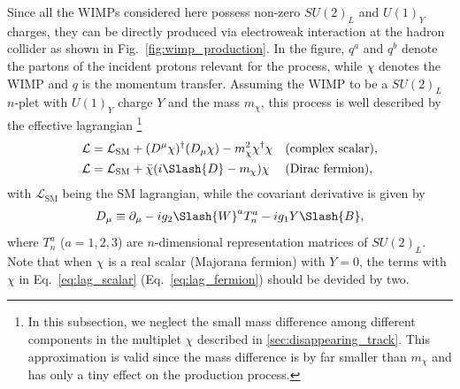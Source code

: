 \documentclass[12pt,twoside,book]{article}
\begin{document}
Since all the WIMPs considered here possess non-zero $SU(2)_L$ and $U(1)_Y$ charges, they can be directly produced via electroweak interaction at the hadron collider as shown in Fig.~\ref{fig:wimp_production}.
In the figure, $q^a$ and $q^b$ denote the partons of the incident protons relevant for the process, while $\chi$ denotes the WIMP and $q$ is the momentum transfer.
Assuming the WIMP to be a $SU(2)_L$ $n$-plet with $U(1)_Y$ charge $Y$ and the mass $m_\chi$, this process is well described by the effective lagrangian
\footnote{
  In this subsection, we neglect the small mass difference among different components in the multiplet $\chi$ described in \ref{sec:disappearing_track}.
  This approximation is valid since the mass difference is by far smaller than $m_\chi$ and has only a tiny effect on the production process.
}
\begin{align}
  \mathcal{L} &= \mathcal{L}_{\mathrm{SM}} + (D^\mu \chi)^\dagger (D_\mu \chi) - m_\chi^2 \chi^\dagger \chi &
  &\text{(complex scalar)}, \label{eq:lag_scalar}\\
  \mathcal{L} &= \mathcal{L}_{\mathrm{SM}} + \bar{\chi} (i \Slash{D} - m_\chi) \chi &
  &\text{(Dirac fermion)}, \label{eq:lag_fermion}
\end{align}
with $\mathcal{L}_{\mathrm{SM}}$ being the SM lagrangian, while the covariant derivative is given by
\begin{align}
  D_\mu \equiv \partial_\mu - i g_2 \Slash{W}^a T_n^a - i g_1 Y \Slash{B},
\end{align}
where $T_n^a$ ($a=1,2,3$) are $n$-dimensional representation matrices of $SU(2)_L$.
Note that when $\chi$ is a real scalar (Majorana fermion) with $Y=0$, the terms with $\chi$ in Eq.~\eqref{eq:lag_scalar} (Eq.~\eqref{eq:lag_fermion}) should be devided by two.
\end{document}
